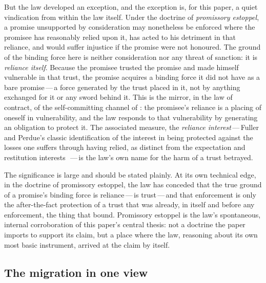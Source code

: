 But the law developed an exception, and the exception is, for this paper, a quiet vindication from within the law itself. Under the doctrine of \emph{promissory estoppel}, a promise unsupported by consideration may nonetheless be enforced where the promisee has reasonably relied upon it, has acted to his detriment in that reliance, and would suffer injustice if the promise were not honoured. The ground of the binding force here is neither consideration nor any threat of sanction: it is \emph{reliance itself}. Because the promisee trusted the promise and made himself vulnerable in that trust, the promise acquires a binding force it did not have as a bare promise\,---\,a force generated by the trust placed in it, not by anything exchanged for it or any sword behind it. This is the mirror, in the law of contract, of the self-committing channel of : the promisee's reliance is a placing of oneself in vulnerability, and the law responds to that vulnerability by generating an obligation to protect it. The associated measure, the \emph{reliance interest}\,---\,Fuller and Perdue's classic identification of the interest in being protected against the losses one suffers through having relied, as distinct from the expectation and restitution interests~\parencite{fullerperdue1936}\,---\,is the law's own name for the harm of a trust betrayed.

The significance is large and should be stated plainly. At its own technical edge, in the doctrine of promissory estoppel, the law has conceded that the true ground of a promise's binding force is reliance\,---\,is trust\,---\,and that enforcement is only the after-the-fact protection of a trust that was already, in itself and before any enforcement, the thing that bound. Promissory estoppel is the law's spontaneous, internal corroboration of this paper's central thesis: not a doctrine the paper imports to support its claim, but a place where the law, reasoning about its own most basic instrument, arrived at the claim by itself.

\subsection{The migration in one view}
\label{p13:sub:jur-summary}

